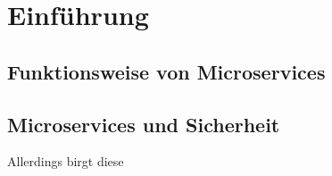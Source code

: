 \section{Einführung}
\label{sec:einführung}

\subsection{Funktionsweise von Microservices}

\subsection{Microservices und Sicherheit}

Allerdings birgt diese 